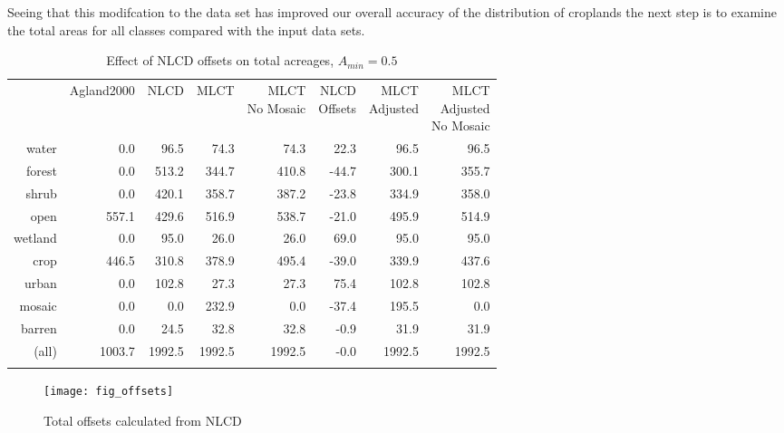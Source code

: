 Seeing that this modifcation to the data set has improved our overall
accuracy of the distribution of croplands the next step is to examine
the total areas for all classes compared with the input data sets.  


\begin{table}[ht]
\begin{center}
{\small
\begin{tabular}{rrrrrrrr}
  \hline
 & Agland2000 & NLCD & MLCT & \pbox[c][][c]{3in}{MLCT\\No Mosaic} & \pbox[c][][c]{3in}{NLCD\\Offsets} & \pbox[c][][c]{3in}{MLCT\\Adjusted} & \pbox[c][][c]{3in}{\smallskip{}MLCT\\Adjusted\\No Mosaic} \\ 
  \noalign{\smallskip} \hline
water & 0.0 & 96.5 & 74.3 & 74.3 & 22.3 & 96.5 & 96.5 \\ 
  forest & 0.0 & 513.2 & 344.7 & 410.8 & -44.7 & 300.1 & 355.7 \\ 
  shrub & 0.0 & 420.1 & 358.7 & 387.2 & -23.8 & 334.9 & 358.0 \\ 
  open & 557.1 & 429.6 & 516.9 & 538.7 & -21.0 & 495.9 & 514.9 \\ 
  wetland & 0.0 & 95.0 & 26.0 & 26.0 & 69.0 & 95.0 & 95.0 \\ 
  crop & 446.5 & 310.8 & 378.9 & 495.4 & -39.0 & 339.9 & 437.6 \\ 
  urban & 0.0 & 102.8 & 27.3 & 27.3 & 75.4 & 102.8 & 102.8 \\ 
  mosaic & 0.0 & 0.0 & 232.9 & 0.0 & -37.4 & 195.5 & 0.0 \\ 
  barren & 0.0 & 24.5 & 32.8 & 32.8 & -0.9 & 31.9 & 31.9 \\ 
  (all) & 1003.7 & 1992.5 & 1992.5 & 1992.5 & -0.0 & 1992.5 & 1992.5 \\ 
   \noalign{\smallskip} \hline
\end{tabular}
}
\caption{Effect of NLCD offsets on total acreages, $A_{min}=0.5$}
\label{tab:areas2}
\end{center}
\end{table}
\begin{figure}[hpt]
  \centering

 

  \texttt{[image: fig\_offsets]}
  \caption{Total offsets calculated from NLCD}
  \label{fig:offsets}
\end{figure}



